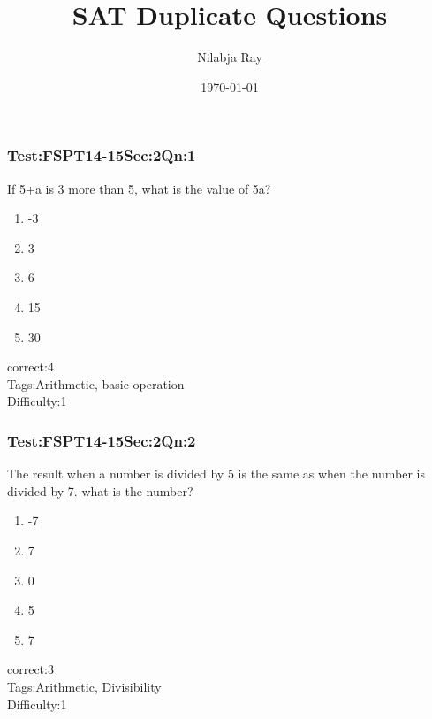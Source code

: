 \documentclass[]{beamer}
\title{ SAT Duplicate Questions}
\author{Nilabja Ray}
\date{\today}
\begin{document}
	\begin{frame}
	  \titlepage
	\end{frame}
	
	\begin{frame}
	    \frametitle{Test:FSPT14-15\hspace{2mm}Sec:2\hspace{2mm}Qn:1}
If 5+a is 3 more than 5, what is the value of 5a?	       
	    \begin{enumerate}
	        \item
	            -3
	        \item
	            3
	        \item
	            6
	        \item
	            15
	        \item
	            30
	    \end{enumerate}
	    correct:4  \\   
	    Tags:Arithmetic, basic operation    \\
	    Difficulty:1   \\
    \end{frame}
    \begin{frame}
	    \frametitle{Test:FSPT14-15\hspace{2mm}Sec:2\hspace{2mm}Qn:2}
The result when a number is divided by 5 is the same as when the number is divided by 7. what is the number?	       
	    \begin{enumerate}
	        \item
	            -7
	        \item
	            7
	        \item
	            0
	        \item
	            5
	        \item
	            7
	    \end{enumerate}
	    correct:3  \\   
	    Tags:Arithmetic, Divisibility    \\
	    Difficulty:1   \\
    \end{frame}
\end{document}
